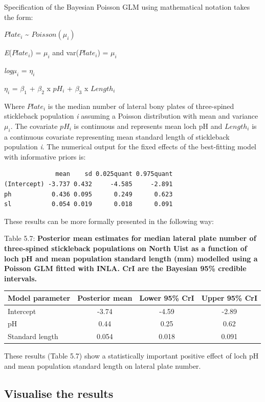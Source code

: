 \documentclass[
]{book}
\begin{document}
Specification of the Bayesian Poisson GLM using mathematical notation takes the form:

\(Plate_{i}\) \textasciitilde{} \(Poisson(\mu_{i})\)

\emph{E}(\(Plate_{i}\)) = \(\mu_i\) and var(\(Plate_{i}\)) = \(\mu_i\)

\emph{log}\(\mu_i\) = \(\eta_i\)

\(\eta_i\) = \(\beta_1\) + \(\beta_2\) x \(pH_{i}\) + \(\beta_3\) x \(Length_{i}\)

Where \(Plate_{i}\) is the median number of lateral bony plates of three-spined stickleback population \emph{i} assuming a Poisson distribution with mean and variance \(\mu_i\). The covariate \(pH_{i}\) is continuous and represents mean loch pH and \(Length_{i}\) is a continuous covariate representing mean standard length of stickleback population \emph{i}. The numerical output for the fixed effects of the best-fitting model with informative priors is:

\begin{verbatim}
              mean    sd 0.025quant 0.975quant
(Intercept) -3.737 0.432     -4.585     -2.891
ph           0.436 0.095      0.249      0.623
sl           0.054 0.019      0.018      0.091
\end{verbatim}

These results can be more formally presented in the following way:

Table 5.7: \textbf{Posterior mean estimates for median lateral plate number of three-spined stickleback populations on North Uist as a function of loch pH and mean population standard length (mm) modelled using a Poisson GLM fitted with INLA. CrI are the Bayesian 95\% credible intervals.}

\begin{longtable}[]{@{}lccc@{}}
\toprule
Model parameter & Posterior mean & Lower 95\% CrI & Upper 95\% CrI \\
\midrule
\endhead
Intercept & -3.74 & -4.59 & -2.89 \\
pH & 0.44 & 0.25 & 0.62 \\
Standard length & 0.054 & 0.018 & 0.091 \\
\bottomrule
\end{longtable}

These results (Table 5.7) show a statistically important positive effect of loch pH and mean population standard length on lateral plate number.

\hypertarget{visualise-the-results-1}{%
\subsection{Visualise the results}\label{visualise-the-results-1}}
\end{document}
